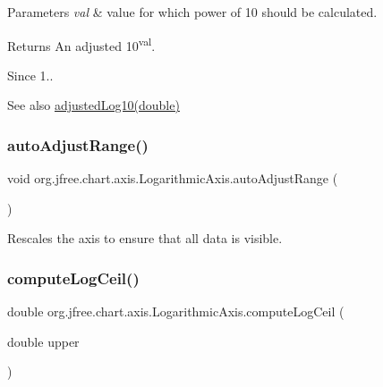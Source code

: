 \begin{DoxyParams}{Parameters}
{\em val} & value for which power of 10 should be calculated.\\
\hline
\end{DoxyParams}
\begin{DoxyReturn}{Returns}
An adjusted 10\textsuperscript{val}.
\end{DoxyReturn}
\begin{DoxySince}{Since}
1.. 
\end{DoxySince}
\begin{DoxySeeAlso}{See also}
\mbox{\hyperlink{classorg_1_1jfree_1_1chart_1_1axis_1_1_logarithmic_axis_a44a08184863352322f6fdf8923b60780}{adjusted\+Log10(double)}} 
\end{DoxySeeAlso}
\mbox{\label{classorg_1_1jfree_1_1chart_1_1axis_1_1_logarithmic_axis_a0f54dfcb35d307b607012249d644b4a3}} 
\subsubsection{\texorpdfstring{auto\+Adjust\+Range()}{autoAdjustRange()}}
{\footnotesize\ttfamily void org.\+jfree.\+chart.\+axis.\+Logarithmic\+Axis.\+auto\+Adjust\+Range (\begin{DoxyParamCaption}{ }\end{DoxyParamCaption})}

Rescales the axis to ensure that all data is visible. \mbox{\label{classorg_1_1jfree_1_1chart_1_1axis_1_1_logarithmic_axis_a7af4b16dd904d824cda4dcca085a33e1}} 
\subsubsection{\texorpdfstring{compute\+Log\+Ceil()}{computeLogCeil()}}
{\footnotesize\ttfamily double org.\+jfree.\+chart.\+axis.\+Logarithmic\+Axis.\+compute\+Log\+Ceil (\begin{DoxyParamCaption}\item[{double}]{upper }\end{DoxyParamCaption})\hspace{0.3cm}{\ttfamily [protected]}}

